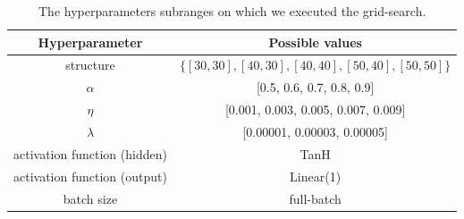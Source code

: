 \begin{center}
    \begin{table}[H]
        \centering
        \small
        \begin{tabular}{|c|c|}
            \hline
            \textbf{Hyperparameter} & \textbf{Possible values} \\ \hline
            
            structure & $\{[30, 30], [40,30], [40, 40], [50, 40], [50, 50]\}$ \\ \hline
            
            $\alpha$ & [0.5, 0.6, 0.7, 0.8, 0.9] \\ \hline
            
            $\eta$ & [0.001, 0.003, 0.005, 0.007, 0.009] \\ \hline
            
            $\lambda$ & [0.00001, 0.00003, 0.00005] \\ \hline
            
            activation function (hidden) & TanH \\ \hline
            
            activation function (output) & Linear(1) \\ \hline
            
            batch size & full-batch \\
            
            \hline
        \end{tabular}
        \caption{The hyperparameters subranges on which we executed the grid-search.}
        \label{tab:hyperparam}
    \end{table}
\end{center}
